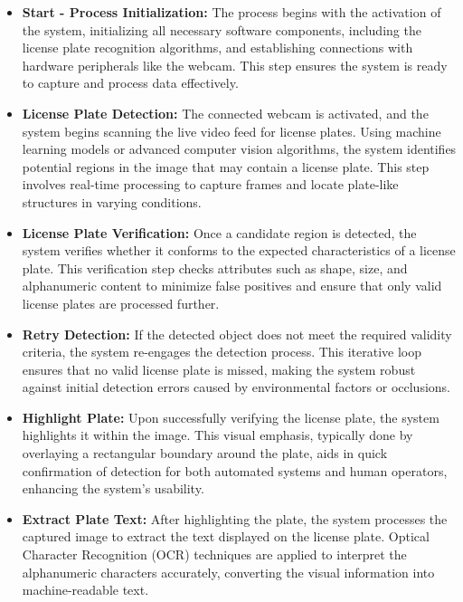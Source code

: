 \begin{itemize}
	\item \textbf{Start - Process Initialization:} The process begins with the activation of the system, initializing all necessary software components, including the license plate recognition algorithms, and establishing connections with hardware peripherals like the webcam. This step ensures the system is ready to capture and process data effectively.
	
	\item \textbf{License Plate Detection:} The connected webcam is activated, and the system begins scanning the live video feed for license plates. Using machine learning models or advanced computer vision algorithms, the system identifies potential regions in the image that may contain a license plate. This step involves real-time processing to capture frames and locate plate-like structures in varying conditions.
	
	\item \textbf{License Plate Verification:} Once a candidate region is detected, the system verifies whether it conforms to the expected characteristics of a license plate. This verification step checks attributes such as shape, size, and alphanumeric content to minimize false positives and ensure that only valid license plates are processed further.
	
	\item \textbf{Retry Detection:} If the detected object does not meet the required validity criteria, the system re-engages the detection process. This iterative loop ensures that no valid license plate is missed, making the system robust against initial detection errors caused by environmental factors or occlusions.
	
	\item \textbf{Highlight Plate:} Upon successfully verifying the license plate, the system highlights it within the image. This visual emphasis, typically done by overlaying a rectangular boundary around the plate, aids in quick confirmation of detection for both automated systems and human operators, enhancing the system's usability.
	
	\item \textbf{Extract Plate Text:} After highlighting the plate, the system processes the captured image to extract the text displayed on the license plate. Optical Character Recognition (OCR) techniques are applied to interpret the alphanumeric characters accurately, converting the visual information into machine-readable text.
	

\end{itemize}
